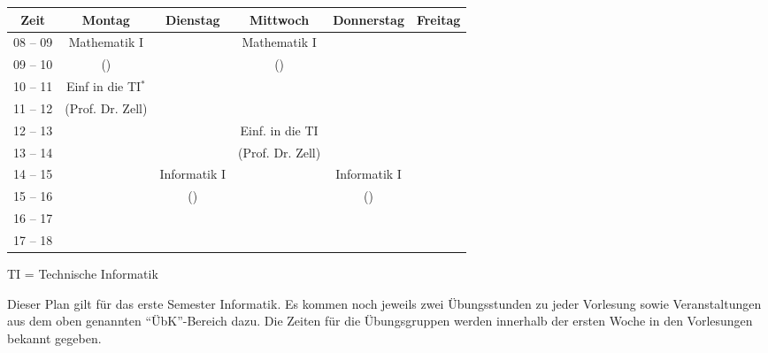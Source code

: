 \begin{minipage}{\textwidth}
    \footnotesize
\begin{center}
	\begin{tabular}{|c|c|c|c|c|c|}
	\hline
	 Zeit     &    Montag                    & Dienstag          & Mittwoch          	& Donnerstag & Freitag \\ \hline\hline
	 08 -- 09 &    Mathematik I              &                   & Mathematik I      	&  &  \\ \cline{1-1} \cline{3-3} \cline{5-6} 
	 09 -- 10 &    (\Matheprof)              &                   & (\Matheprof) 	&  &  \\ \hline
	 10 -- 11 &    Einf in die TI$^*$        &                   &                   	&  &  \\ \cline{1-1} \cline{3-6} 
	 11 -- 12 &    (Prof. Dr. Zell)          &                   &                   	&  &  \\ \hline
	 12 -- 13 &                              &                   & Einf. in die TI    	&  &  \\ \cline{1-3} \cline{5-6}
	 13 -- 14 &                              &                   & (Prof. Dr. Zell)   	&  &  \\ \hline
	 14 -- 15 &                              & Informatik I  	 &                 			&  Informatik I &  \\ \cline{1-2} \cline{4-4} \cline{6-6}
	 15 -- 16 &                              & (\Infoprof)  &                   	&  (\Infoprof) &  \\ \hline
	 16 -- 17 &                              &                   &                   	&  &  \\ \hline
	 17 -- 18 &                              &                   &                   	&  &  \\ \hline
	\end{tabular}
	
\scriptsize TI = Technische Informatik\\

\end{center}
\end{minipage}
Dieser Plan gilt für das erste Semester Informatik. Es kommen noch jeweils zwei Übungsstunden zu jeder Vorlesung 
sowie Veranstaltungen aus dem oben genannten "`\"UbK"'-Bereich dazu.
Die Zeiten für die Übungsgruppen werden innerhalb der ersten Woche in den Vorlesungen bekannt gegeben.
